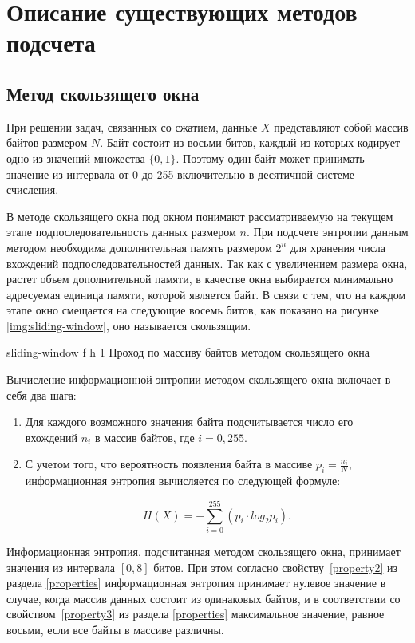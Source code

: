 \chapter{Описание существующих методов подсчета}

\section{Метод скользящего окна}

При решении задач, связанных со сжатием, данные $X$ представляют собой массив байтов размером $N$. Байт состоит из восьми битов, каждый из которых кодирует одно из значений множества $\{0, 1\}$. Поэтому один байт может принимать значение из интервала от 0 до 255 включительно в десятичной системе счисления. 

В методе скользящего окна \cite{sliding-window-method} под окном понимают рассматриваемую на текущем этапе подпоследовательность данных размером $n$. При подсчете энтропии данным методом необходима дополнительная память размером $2^n$ для хранения числа вхождений подпоследовательностей данных. Так как с увеличением размера окна, растет объем дополнительной памяти, в качестве окна выбирается минимально адресуемая единица памяти, которой является байт. В связи с тем, что на каждом этапе окно смещается на следующие восемь битов, как показано на рисунке \ref{img:sliding-window}, оно называется скользящим.

    {sliding-window}
    {f}
    {h}
    {1\textwidth}
    {Проход по массиву байтов методом скользящего окна}
    
Вычисление информационной энтропии методом скользящего окна включает в себя два шага:

\begin{enumerate}
	\item Для каждого возможного значения байта подсчитывается число его вхождений $n_{i}$ в массив байтов, где $i = \overline{0, 255}$.
	\item С учетом того, что вероятность появления байта в массиве $p_{i} = \frac{n_{i}}{N}$, информационная энтропия вычисляется по следующей формуле:
	
	\begin{equation}
		H(X) = -\sum_{i = 0}^{255} (p_{i} \cdot log_{2}p_{i}).
	\end{equation}
\end{enumerate}

Информационная энтропия, подсчитанная методом скользящего окна, принимает значения из интервала $[0, 8]$ битов. При этом согласно свойству~\ref{property2} из раздела \ref{properties} информационная энтропия принимает нулевое значение в случае, когда массив данных состоит из одинаковых байтов, и в соответствии со свойством~\ref{property3} из раздела \ref{properties} максимальное значение, равное восьми, если все байты в массиве различны.

